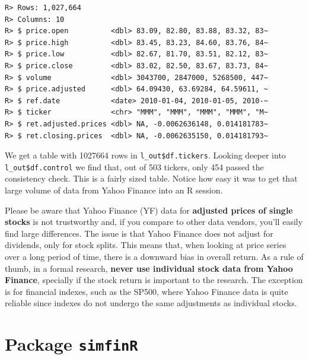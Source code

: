 \documentclass[
  12pt,
]{book}
\newenvironment{Shaded}{\begin{snugshade}}{\end{snugshade}}
\newcommand{\FunctionTok}[1]{\textcolor[rgb]{0,0,0}{#1}}
\newcommand{\NormalTok}[1]{#1}
\newcommand{\SpecialCharTok}[1]{\textcolor[rgb]{0,0,0}{#1}}
\newenvironment{rmdcaution}
{\begin{cautionblock}
		
	} {\end{cautionblock}}
\begin{document}
\begin{Shaded}
\end{Shaded}

\begin{verbatim}
R> Rows: 1,027,664
R> Columns: 10
R> $ price.open          <dbl> 83.09, 82.80, 83.88, 83.32, 83~
R> $ price.high          <dbl> 83.45, 83.23, 84.60, 83.76, 84~
R> $ price.low           <dbl> 82.67, 81.70, 83.51, 82.12, 83~
R> $ price.close         <dbl> 83.02, 82.50, 83.67, 83.73, 84~
R> $ volume              <dbl> 3043700, 2847000, 5268500, 447~
R> $ price.adjusted      <dbl> 64.09430, 63.69284, 64.59611, ~
R> $ ref.date            <date> 2010-01-04, 2010-01-05, 2010-~
R> $ ticker              <chr> "MMM", "MMM", "MMM", "MMM", "M~
R> $ ret.adjusted.prices <dbl> NA, -0.0062636148, 0.014181783~
R> $ ret.closing.prices  <dbl> NA, -0.0062635150, 0.014181793~
\end{verbatim}

We get a table with 1027664 rows in \texttt{l\_out\$df.tickers}. Looking deeper into \texttt{l\_out\$df.control} we find that, out of 503 tickers, only 454 passed the consistency check. This is a fairly sized table. Notice how easy it was to get that large volume of data from Yahoo Finance into an R session.

\begin{rmdcaution}
Please be aware that Yahoo Finance (YF) data for \textbf{adjusted prices
of single stocks} is not trustworthy and, if you compare to other data
vendors, you'll easily find large differences. The issue is that Yahoo
Finance does not adjust for dividends, only for stock splits. This means
that, when looking at price series over a long period of time, there is
a downward bias in overall return. As a rule of thumb, in a formal
research, \textbf{never use individual stock data from Yahoo Finance},
specially if the stock return is important to the research. The
exception is for financial indexes, such as the SP500, where Yahoo
Finance data is quite reliable since indexes do not undergo the same
adjustments as individual stocks.
\end{rmdcaution}

\hypertarget{package-simfinr}{%
\section{\texorpdfstring{Package \texttt{simfinR}}{Package simfinR}}\label{package-simfinr}}
\end{document}
